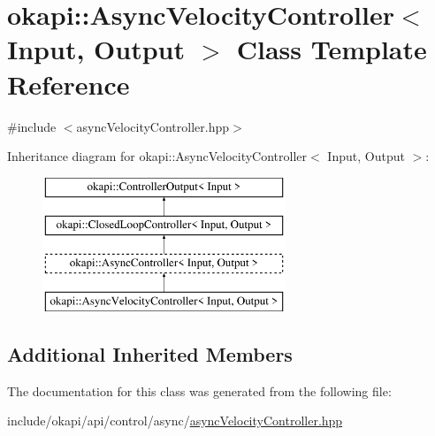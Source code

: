 \hypertarget{classokapi_1_1AsyncVelocityController}{}\section{okapi\+::Async\+Velocity\+Controller$<$ Input, Output $>$ Class Template Reference}
\label{classokapi_1_1AsyncVelocityController}


{\ttfamily \#include $<$async\+Velocity\+Controller.\+hpp$>$}

Inheritance diagram for okapi\+::Async\+Velocity\+Controller$<$ Input, Output $>$\+:\begin{figure}[H]
\begin{center}
\leavevmode
\includegraphics[height=4.000000cm]{classokapi_1_1AsyncVelocityController}
\end{center}
\end{figure}
\subsection*{Additional Inherited Members}


The documentation for this class was generated from the following file\+:\begin{DoxyCompactItemize}
\item 
include/okapi/api/control/async/\mbox{\hyperlink{asyncVelocityController_8hpp}{async\+Velocity\+Controller.\+hpp}}\end{DoxyCompactItemize}
